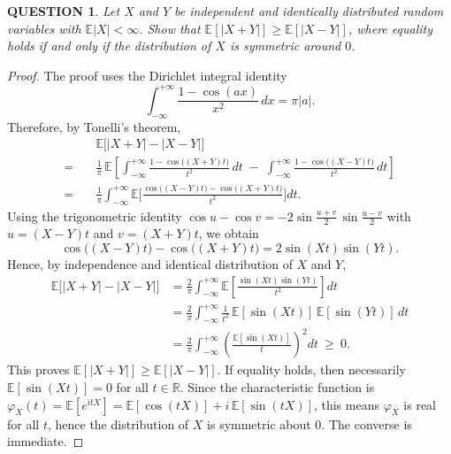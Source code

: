 \documentclass[12pt]{article}
\renewcommand{\(}{\left(}%
\renewcommand{\)}{\right)}%
\renewcommand{\[}{\left[}%
\renewcommand{\]}{\right]}%
\newtheorem{question}{QUESTION}[section]}
\newtheorem{proof}{Proof.}}
\begin{document}

\begin{question}
	Let $X$ and $Y$ be independent and identically distributed random variables with $\mathbb E|X|<\infty$. Show that $\mathbb E[|X+Y|]\ge \mathbb E[|X-Y|]$, where equality holds if and only if the distribution of $X$ is symmetric around $0$.
\end{question}
\begin{proof}
	The proof uses the Dirichlet integral identity
\begin{equation*}
\int_{-\infty}^{+\infty} \frac{1-\cos(a x)}{x^2}\,dx = \pi |a|.
\end{equation*}
Therefore, by Tonelli's theorem,
\begin{equation*}
\begin{split}
	&\mathbb E\big[|X+Y|-|X-Y|\big]\\
=\quad &\frac{1}{\pi}\,\mathbb E\[\int_{-\infty}^{+\infty} \frac{1-\cos\big((X+Y)t\big)}{t^2}\,dt\; -\; \int_{-\infty}^{+\infty} \frac{1-\cos\big((X-Y)t\big)}{t^2}\,dt\]\\
=\quad & \frac{1}{\pi}\int_{-\infty}^{+\infty} \mathbb E\bigg[\frac{\cos\big((X-Y)t\big)-\cos\big((X+Y)t\big)}{t^2}\bigg] dt.
\end{split}
\end{equation*}
Using the trigonometric identity $\cos u-\cos v=-2\sin\frac{u+v}{2}\,\sin\frac{u-v}{2}$ with $u=(X-Y)t$ and $v=(X+Y)t$, we obtain
\begin{equation*}
\cos\big((X-Y)t\big)-\cos\big((X+Y)t\big) = 2\sin(Xt)\sin(Yt).
\end{equation*}
Hence, by independence and identical distribution of $X$ and $Y$,
\begin{equation*}
\begin{split}
	\mathbb E\big[|X+Y|-|X-Y|\big]
&= \frac{2}{\pi}\int_{-\infty}^{+\infty} \mathbb E\left[\frac{\sin(Xt)\sin(Yt)}{t^2}\right] dt\\
&= \frac{2}{\pi}\int_{-\infty}^{+\infty} \frac{1}{t^2}\,\mathbb E[\sin(Xt)]\,\mathbb E[\sin(Yt)]\,dt\\
&= \frac{2}{\pi}\int_{-\infty}^{+\infty} \left(\frac{\mathbb E[\sin(Xt)]}{t}\right)^{\!2} dt\ \ge\ 0.
\end{split}
\end{equation*}
This proves $\mathbb E[|X+Y|] \ge \mathbb E[|X-Y|]$. If equality holds, then necessarily $\mathbb E[\sin(Xt)]=0$ for all $t\in\mathbb R$. Since the characteristic function is $\varphi_X(t)=\mathbb E[e^{itX}]=\mathbb E[\cos(tX)]+i\,\mathbb E[\sin(tX)]$, this means $\varphi_X$ is real for all $t$, hence the distribution of $X$ is symmetric about $0$. The converse is immediate.
\end{proof}
\end{document}
